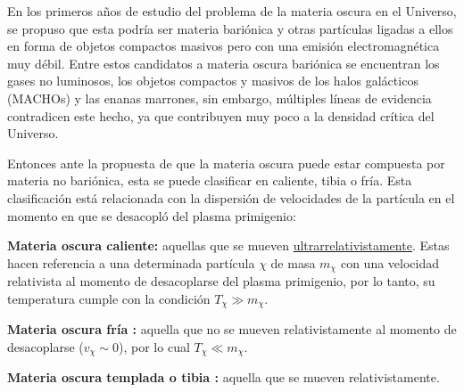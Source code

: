En los primeros a\~nos de estudio del problema de la materia oscura en el Universo, se propuso que esta podría ser materia bariónica y otras partículas ligadas a ellos en forma de objetos compactos masivos pero con una emisión electromagnética muy débil. Entre estos candidatos a materia oscura bariónica se encuentran los gases no luminosos, los objetos compactos y masivos de los halos galácticos (MACHOs) y las enanas marrones, sin embargo, múltiples líneas de evidencia contradicen este hecho, ya que contribuyen muy poco a la densidad crítica del Universo.

Entonces ante la propuesta de que la materia oscura puede estar compuesta por materia no bariónica, esta se puede clasificar en caliente, tibia o fría. Esta clasificación está relacionada con la dispersión de velocidades de la partícula en el momento en que se desacopló del plasma primigenio:
\begin{itemize_f}
\item \textbf{Materia oscura caliente: } aquellas que se mueven \href{https://en.wikipedia.org/wiki/Ultrarelativistic_limit}{ultrarrelativistamente}. Estas hacen referencia a una determinada partícula $\chi$ de masa $m_\chi$ con una velocidad relativista al momento de desacoplarse del plasma primigenio, por lo tanto, su temperatura cumple con la condición $T_\chi \gg m_\chi$. 

\item \textbf{Materia oscura fría :} aquella que no se mueven relativistamente al momento de desacoplarse ($v_\chi \sim 0$), por lo cual $T_\chi \ll m_\chi$. 

\item \textbf{Materia oscura templada o tibia :} aquella que se mueven relativistamente. %
\end{itemize_f}

